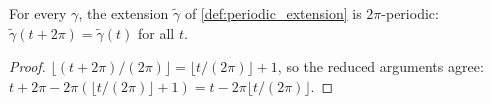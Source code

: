 \begin{lemma}
  \label{lem:periodic_extension_periodic}
  For every $\gamma$, the extension $\tilde\gamma$ of \cref{def:periodic_extension} is
  $2\pi$-periodic: $\tilde\gamma(t+2\pi)=\tilde\gamma(t)$ for all $t$.
\end{lemma}

\begin{proof}

\leanok
  $\lfloor(t+2\pi)/(2\pi)\rfloor=\lfloor t/(2\pi)\rfloor+1$, so the reduced arguments
  agree: $t+2\pi-2\pi(\lfloor t/(2\pi)\rfloor+1)=t-2\pi\lfloor t/(2\pi)\rfloor$.
\end{proof}

\begin{lemma}


\end{lemma}
